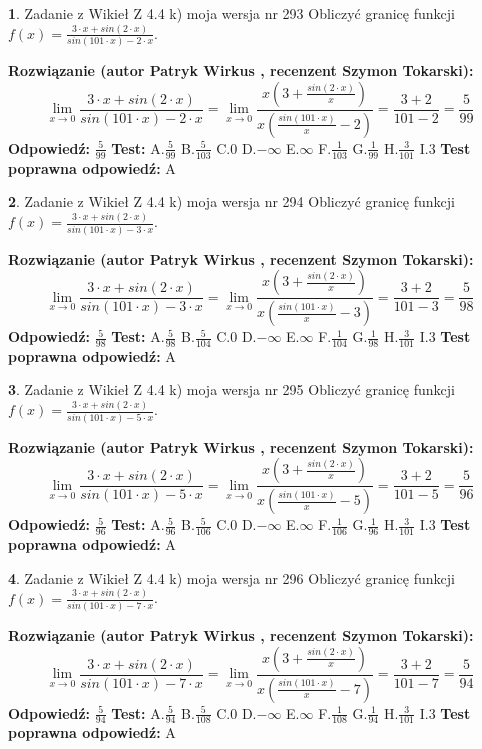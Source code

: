 \documentclass[12pt, a4paper]{article}
\theoremstyle{definition} %
\newtheorem{zad}{}
\newcommand{\zadStart}[1]{\begin{zad}#1\newline}
\newcommand{\zadStop}{\end{zad}}
\newcommand{\rozwStart}[2]{\noindent \textbf{Rozwiązanie (autor #1 , recenzent #2): }\newline}
\newcommand{\rozwStop}{\newline}
\newcommand{\odpStart}{\noindent \textbf{Odpowiedź:}\newline}
\newcommand{\odpStop}{\newline}
\newcommand{\testStart}{\noindent \textbf{Test:}\newline}
\newcommand{\testStop}{\newline}
\newcommand{\kluczStart}{\noindent \textbf{Test poprawna odpowiedź:}\newline}
\newcommand{\kluczStop}{\newline}
\begin{document}
\zadStart{Zadanie z Wikieł Z 4.4 k) moja wersja nr 293}
Obliczyć granicę funkcji $f(x)=\frac{3\cdot x +sin(2\cdot x)}{sin(101\cdot x) -2\cdot x}$.
\zadStop
\rozwStart{Patryk Wirkus}{Szymon Tokarski}
$$\lim\limits_{x\to 0}\frac{3\cdot x +sin(2\cdot x)}{sin(101\cdot x) -2\cdot x}
=\lim\limits_{x\to 0}\frac{x(3+\frac{sin(2\cdot x)}{x})}{x(\frac{sin(101\cdot x)}{x}-2)}
=\frac{3+2}{101-2} = \frac{5}{99}$$
\rozwStop
\odpStart
$\frac{5}{99}$
\odpStop
\testStart
A.$\frac{5}{99}$
B.$\frac{5}{103}$
C.$0$
D.$-\infty$
E.$\infty$
F.$\frac{1}{103}$
G.$\frac{1}{99}$
H.$\frac{3}{101}$
I.$3$
\testStop
\kluczStart
A
\kluczStop



\zadStart{Zadanie z Wikieł Z 4.4 k) moja wersja nr 294}
Obliczyć granicę funkcji $f(x)=\frac{3\cdot x +sin(2\cdot x)}{sin(101\cdot x) -3\cdot x}$.
\zadStop
\rozwStart{Patryk Wirkus}{Szymon Tokarski}
$$\lim\limits_{x\to 0}\frac{3\cdot x +sin(2\cdot x)}{sin(101\cdot x) -3\cdot x}
=\lim\limits_{x\to 0}\frac{x(3+\frac{sin(2\cdot x)}{x})}{x(\frac{sin(101\cdot x)}{x}-3)}
=\frac{3+2}{101-3} = \frac{5}{98}$$
\rozwStop
\odpStart
$\frac{5}{98}$
\odpStop
\testStart
A.$\frac{5}{98}$
B.$\frac{5}{104}$
C.$0$
D.$-\infty$
E.$\infty$
F.$\frac{1}{104}$
G.$\frac{1}{98}$
H.$\frac{3}{101}$
I.$3$
\testStop
\kluczStart
A
\kluczStop



\zadStart{Zadanie z Wikieł Z 4.4 k) moja wersja nr 295}
Obliczyć granicę funkcji $f(x)=\frac{3\cdot x +sin(2\cdot x)}{sin(101\cdot x) -5\cdot x}$.
\zadStop
\rozwStart{Patryk Wirkus}{Szymon Tokarski}
$$\lim\limits_{x\to 0}\frac{3\cdot x +sin(2\cdot x)}{sin(101\cdot x) -5\cdot x}
=\lim\limits_{x\to 0}\frac{x(3+\frac{sin(2\cdot x)}{x})}{x(\frac{sin(101\cdot x)}{x}-5)}
=\frac{3+2}{101-5} = \frac{5}{96}$$
\rozwStop
\odpStart
$\frac{5}{96}$
\odpStop
\testStart
A.$\frac{5}{96}$
B.$\frac{5}{106}$
C.$0$
D.$-\infty$
E.$\infty$
F.$\frac{1}{106}$
G.$\frac{1}{96}$
H.$\frac{3}{101}$
I.$3$
\testStop
\kluczStart
A
\kluczStop



\zadStart{Zadanie z Wikieł Z 4.4 k) moja wersja nr 296}
Obliczyć granicę funkcji $f(x)=\frac{3\cdot x +sin(2\cdot x)}{sin(101\cdot x) -7\cdot x}$.
\zadStop
\rozwStart{Patryk Wirkus}{Szymon Tokarski}
$$\lim\limits_{x\to 0}\frac{3\cdot x +sin(2\cdot x)}{sin(101\cdot x) -7\cdot x}
=\lim\limits_{x\to 0}\frac{x(3+\frac{sin(2\cdot x)}{x})}{x(\frac{sin(101\cdot x)}{x}-7)}
=\frac{3+2}{101-7} = \frac{5}{94}$$
\rozwStop
\odpStart
$\frac{5}{94}$
\odpStop
\testStart
A.$\frac{5}{94}$
B.$\frac{5}{108}$
C.$0$
D.$-\infty$
E.$\infty$
F.$\frac{1}{108}$
G.$\frac{1}{94}$
H.$\frac{3}{101}$
I.$3$
\testStop
\kluczStart
A
\kluczStop
\end{document}

